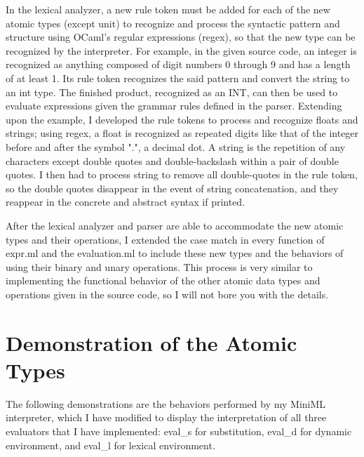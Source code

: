 \documentclass[12pt]{article}
\begin{document}
In the lexical analyzer, a new rule token must be added for each of the new atomic types (except unit) to recognize and process the syntactic pattern and structure using OCaml's regular expressions (regex), so that the new type can be recognized by the interpreter. For example, in the given source code, an integer is recognized as anything composed of digit numbers 0 through 9 and has a length of at least 1. Its rule token recognizes the said pattern and convert the string to an int type. The finished product, recognized as an INT, can then be used to evaluate expressions given the grammar rules defined in the parser. Extending upon the example, I developed the rule tokens to process and recognize floats and strings; using regex, a float is recognized as repeated digits like that of the integer before and after the symbol ".", a decimal dot. A string is the repetition of any characters except double quotes and double-backslash within a pair of double quotes. I then had to process string to remove all double-quotes in the rule token, so the double quotes disappear in the event of string concatenation, and they reappear in the concrete and abstract syntax if printed. 

After the lexical analyzer and parser are able to accommodate the new atomic types and their operations, I extended the case match in every function of expr.ml and the evaluation.ml to include these new types and the behaviors of using their binary and unary operations. This process is very similar to implementing the functional behavior of the other atomic data types and operations given in the source code, so I will not bore you with the details. 

\section{Demonstration of the Atomic Types}

The following demonstrations are the behaviors performed by my MiniML interpreter, which I have modified to display the interpretation of all three evaluators that I have implemented: eval\_s for substitution, eval\_d for dynamic environment, and eval\_l for lexical environment.
\end{document}
